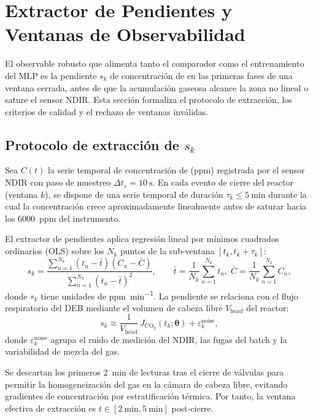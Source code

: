 \section{Extractor de Pendientes y Ventanas de Observabilidad}
\label{sec:cap4_ventanas}

El observable robusto que alimenta tanto el comparador como el entrenamiento del MLP es la pendiente $s_k$ de concentración de  en las primeras fases de una ventana cerrada, antes de que la acumulación gaseosa alcance la zona no lineal o sature el sensor NDIR. Esta sección formaliza el protocolo de extracción, los criterios de calidad y el rechazo de ventanas inválidas.

\subsection{Protocolo de extracción de $s_k$}

Sea $C(t)$ la serie temporal de concentración de  (ppm) registrada por el sensor NDIR con paso de muestreo $\Delta t_s = \SI{10}{\second}$. En cada evento de cierre del reactor (ventana $k$), se dispone de una serie temporal de duración $\tau_k \leq \SI{5}{\minute}$ durante la cual la concentración crece aproximadamente linealmente antes de saturar hacia los \SI{6000}{ppm} del instrumento.

El extractor de pendientes aplica regresión lineal por mínimos cuadrados ordinarios (OLS) sobre los $N_k$ puntos de la sub-ventana $[t_k, t_k+\tau_k]$:
\begin{equation}
s_k = \frac{\sum_{n=1}^{N_k}(t_n - \bar{t})(C_n - \bar{C})}{\sum_{n=1}^{N_k}(t_n - \bar{t})^2},
\qquad
\bar{t} = \frac{1}{N_k}\sum_{n=1}^{N_k} t_n,\;
\bar{C} = \frac{1}{N_k}\sum_{n=1}^{N_k} C_n,
\label{eq:pendiente_ols}
\end{equation}
donde $s_k$ tiene unidades de \si{ppm\per\minute}. La pendiente se relaciona con el flujo respiratorio del DEB mediante el volumen de cabeza libre $V_{\mathrm{head}}$ del reactor:
\begin{equation}
s_k \approx \frac{1}{V_{\mathrm{head}}}\,J_{\mathrm{CO_2}}(t_k;\boldsymbol{\theta}) + \varepsilon_k^{\mathrm{noise}},
\label{eq:pendiente_flujo}
\end{equation}
donde $\varepsilon_k^{\mathrm{noise}}$ agrupa el ruido de medición del NDIR, las fugas del batch y la variabilidad de mezcla del gas.

Se descartan los primeros \SI{2}{\minute} de lecturas tras el cierre de válvulas para permitir la homogeneización del gas en la cámara de cabeza libre, evitando gradientes de concentración por estratificación térmica. Por tanto, la ventana efectiva de extracción es $t \in [\SI{2}{\minute}, \SI{5}{\minute}]$ post-cierre.

